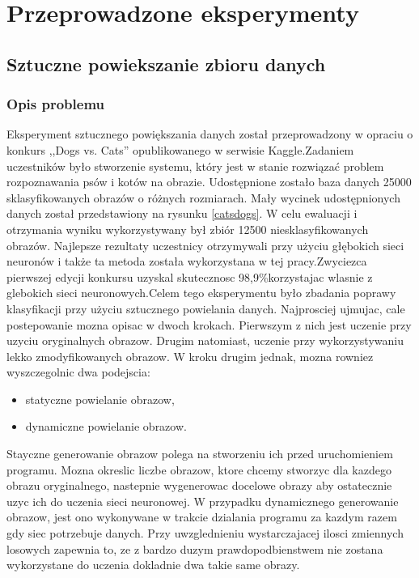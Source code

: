\section{Przeprowadzone eksperymenty} \label{results}


\subsection{Sztuczne powiekszanie zbioru danych}
\subsubsection{Opis problemu}
Eksperyment sztucznego powiększania danych został przeprowadzony w opraciu o konkurs ,,Dogs vs. Cats'' opublikowanego w serwisie Kaggle.\footnotemark Zadaniem uczestników było stworzenie systemu, który jest w stanie rozwiązać problem rozpoznawania psów i kotów na obrazie. Udostępnione zostało baza danych 25000 sklasyfikowanych obrazów o różnych rozmiarach. Mały wycinek udostępnionych danych został przedstawiony na rysunku \ref{catsdogs}. W celu ewaluacji i otrzymania wyniku wykorzystywany był zbiór 12500 niesklasyfikowanych obrazów. Najlepsze rezultaty uczestnicy otrzymywali przy użyciu głębokich sieci neuronów i także ta metoda została wykorzystana w tej pracy.Zwyciezca pierwszej edycji konkursu uzyskal skutecznosc 98,9\%\footnotemark korzystajac wlasnie z glebokich sieci neuronowych.Celem tego eksperymentu było zbadania poprawy klasyfikacji przy użyciu sztucznego powielania danych. Najprosciej ujmujac, cale postepowanie mozna opisac w dwoch krokach. Pierwszym z nich jest uczenie przy uzyciu oryginalnych obrazow. Drugim natomiast, uczenie przy wykorzystywaniu lekko zmodyfikowanych obrazow. W kroku drugim jednak, mozna rowniez wyszczegolnic dwa podejscia:
\begin{itemize}
\item statyczne powielanie obrazow,
\item dynamiczne powielanie obrazow.
\end{itemize}
Stayczne generowanie obrazow polega na stworzeniu ich przed uruchomieniem programu. Mozna okreslic liczbe obrazow, ktore chcemy stworzyc dla kazdego obrazu oryginalnego, nastepnie wygenerowac docelowe obrazy aby ostatecznie uzyc ich do uczenia sieci neuronowej. W przypadku dynamicznego generowanie obrazow, jest ono wykonywane w trakcie dzialania programu za kazdym razem gdy siec potrzebuje danych. Przy uwzglednieniu wystarczajacej ilosci zmiennych losowych zapewnia to, ze z bardzo duzym prawdopodbienstwem nie zostana wykorzystane do uczenia dokladnie dwa takie same obrazy.

